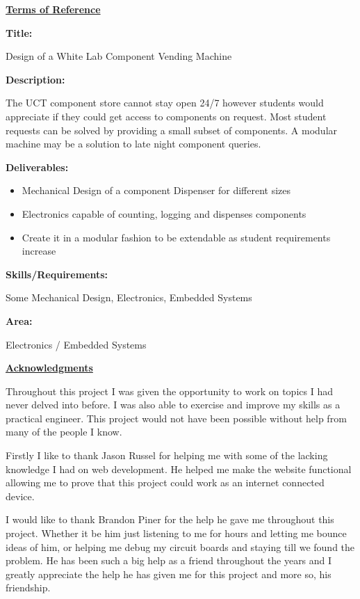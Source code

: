 \documentclass[a4paper,11pt]{article}
\numberwithin{figure}{section}
\numberwithin{table}{section}
\begin{document}
	{\centering\Huge\bfseries\underline{Terms of Reference}\par}
	{\Large\bfseries{Title:}\par}
	Design of a White Lab Component Vending Machine\par
	{\Large\bfseries{Description:}\par}
	The UCT component store cannot stay open 24/7 however students would
appreciate if they could get access to components on request. Most student requests can be solved by providing a small subset of components. A modular machine may be a solution to late night component queries.\par
	{\Large\bfseries{Deliverables:}\par}
	{\begin{itemize}
	\item Mechanical Design of a component Dispenser for different sizes
	\item Electronics capable of counting, logging and dispenses components
	\item Create it in a modular fashion to be extendable as student
requirements increase
	\end{itemize}}
	{\Large\bfseries{Skills/Requirements:}\par}
	Some Mechanical Design, Electronics, Embedded Systems\par
	{\Large\bfseries{Area:}\par}
	Electronics / Embedded Systems\par
	\newpage
	{\centering\Huge\bfseries\underline{Acknowledgments}\par}
	Throughout this project I was given the opportunity to work on topics I had never delved into before. I was also able to exercise and improve my skills as a practical engineer. This project would not have been possible without help from many of the people I know.
	
	Firstly I like to thank Jason Russel for helping me with some of the lacking knowledge I had on web development. He helped me make the website functional allowing me to prove that this project could work as an internet connected device.
	
	I would like to thank Brandon Piner for the help he gave me throughout this project. Whether it be him just listening to me for hours and letting me bounce ideas of him, or helping me debug my circuit boards and staying till we found the problem. He has been such a big help as a friend throughout the years and I greatly appreciate the help he has given me for this project and more so, his friendship.
	
\end{document}

